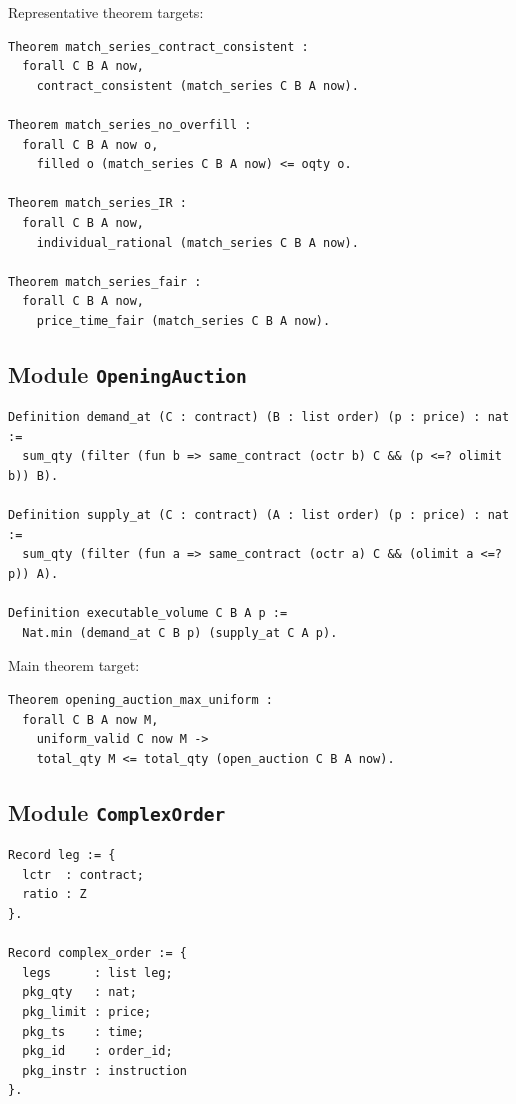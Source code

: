 \documentclass[11pt]{article}
\begin{document}
Representative theorem targets:

\begin{lstlisting}
Theorem match_series_contract_consistent :
  forall C B A now,
    contract_consistent (match_series C B A now).

Theorem match_series_no_overfill :
  forall C B A now o,
    filled o (match_series C B A now) <= oqty o.

Theorem match_series_IR :
  forall C B A now,
    individual_rational (match_series C B A now).

Theorem match_series_fair :
  forall C B A now,
    price_time_fair (match_series C B A now).
\end{lstlisting}

\subsection{Module \texttt{OpeningAuction}}

\begin{lstlisting}
Definition demand_at (C : contract) (B : list order) (p : price) : nat :=
  sum_qty (filter (fun b => same_contract (octr b) C && (p <=? olimit b)) B).

Definition supply_at (C : contract) (A : list order) (p : price) : nat :=
  sum_qty (filter (fun a => same_contract (octr a) C && (olimit a <=? p)) A).

Definition executable_volume C B A p :=
  Nat.min (demand_at C B p) (supply_at C A p).
\end{lstlisting}

Main theorem target:

\begin{lstlisting}
Theorem opening_auction_max_uniform :
  forall C B A now M,
    uniform_valid C now M ->
    total_qty M <= total_qty (open_auction C B A now).
\end{lstlisting}

\subsection{Module \texttt{ComplexOrder}}

\begin{lstlisting}
Record leg := {
  lctr  : contract;
  ratio : Z
}.

Record complex_order := {
  legs      : list leg;
  pkg_qty   : nat;
  pkg_limit : price;
  pkg_ts    : time;
  pkg_id    : order_id;
  pkg_instr : instruction
}.
\end{lstlisting}
\end{document}
